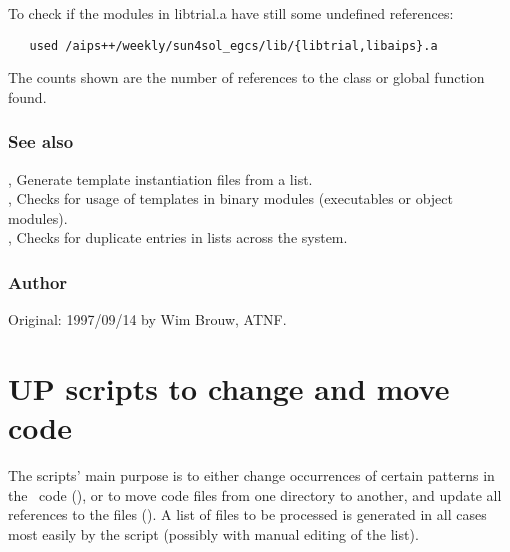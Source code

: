 To check if the modules in libtrial.a have still some undefined references:

\begin{verbatim}
   used /aips++/weekly/sun4sol_egcs/lib/{libtrial,libaips}.a
\end{verbatim}

The counts shown are the number of references to the class or global function
found.

\subsubsection*{See also}

, Generate template instantiation files from a list.\\
, Checks for usage of templates in binary modules (executables
or object modules).\\
, Checks for duplicate entries in  lists
   across the system.

\subsubsection*{Author}

Original: 1997/09/14 by Wim Brouw, ATNF.


\newpage
\section{UP scripts to change and move code}
\label{UPscripts}

The  scripts' main purpose is to either change occurrences of
certain patterns in the \aipspp\ code (), or to move code
files from one directory to another, and update all references to the files
(). A list of files to be processed is generated in all cases
most easily by the  script (possibly with manual editing of
the list).

